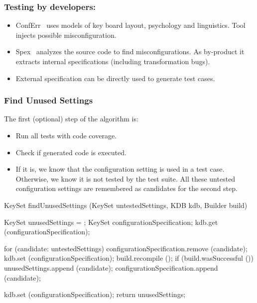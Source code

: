\begin{frame}
	\frametitle{Testing by developers:}
	\begin{itemize}
	\item ConfErr~\cite{keller2008conferr} uses models of key board layout, psychology and linguistics.
	Tool injects possible misconfiguration.
	\item Spex~\citet{xu2013blame} analyzes the source code to find misconfigurations.
	As by-product it extracts internal specifications (including transformation bugs).
	\item External specification can be directly used to generate test cases.
	\end{itemize}
\end{frame}


\begin{frame}
	\frametitle{Find Unused Settings}

	The first (optional) step of the algorithm is:
	\begin{itemize}
	\item Run all tests with code coverage.
	\item Check if generated code is executed.
	\item If it is, we know that the configuration setting is used in a test case.
	Otherwise, we know it is not tested by the test suite.
	All these untested configuration settings are remembered as candidates for the second step.
	\end{itemize}
\end{frame}

\begin{frame}[fragile]
	\small
	\fontsize{10}{0}\selectfont
	\begin{code}[gobble=4,language=Cpp]
	KeySet findUnusedSettings (KeySet untestedSettings,
				   KDB kdb,
				   Builder build)
	{
	   KeySet unusedSettings = {};
	   KeySet configurationSpecification;
	   kdb.get (configurationSpecification);

	   for (candidate: untestedSettings)
	   {
	       configurationSpecification.remove (candidate);
	       kdb.set (configurationSpecification);
	       build.recompile ();
	       if (build.wasSuccessful ())
	       {
	          unusedSettings.append (candidate);
	       }
	       configurationSpecification.append (candidate);
	   }

	   kdb.set (configurationSpecification);
	   return unusedSettings;
	}
	\end{code}
\end{frame}


